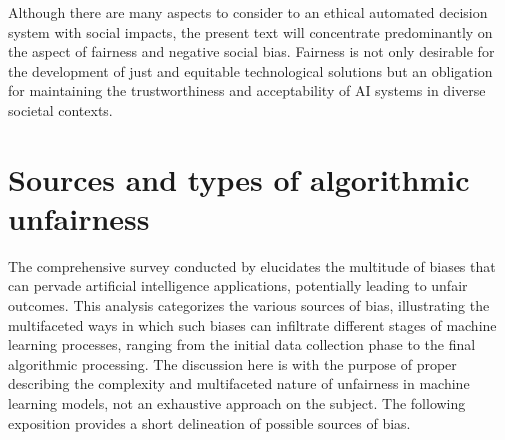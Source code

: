 Although there are many aspects to consider to an ethical automated decision system with social impacts, the present text will concentrate predominantly on the aspect of fairness and negative social bias. Fairness is not only desirable for the development of just and equitable technological solutions but an obligation for maintaining the trustworthiness and acceptability of AI systems in diverse societal contexts.

\section{Sources and types of algorithmic unfairness}

The comprehensive survey conducted by \citet{Mehrabi2019} elucidates the multitude of biases that can pervade artificial intelligence applications, potentially leading to unfair outcomes. This analysis categorizes the various sources of bias, illustrating the multifaceted ways in which such biases can infiltrate different stages of machine learning processes, ranging from the initial data collection phase to the final algorithmic processing. The discussion here is with the purpose of proper describing the complexity and multifaceted nature of unfairness in machine learning models, not an exhaustive approach on the subject.  The following exposition provides a short delineation of possible sources of bias.


